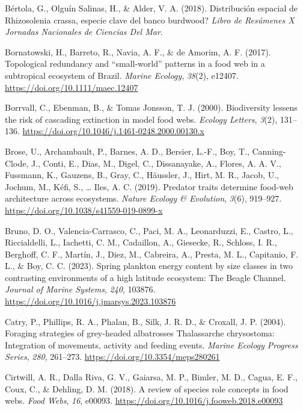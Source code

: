 \documentclass[preprint, 3p,
authoryear]{elsarticle} %
\newlength{\cslhangindent}
\newlength{\cslentryspacingunit} %
\newenvironment{CSLReferences}[2] %
 {%
  \setlength{\parindent}{0pt}
  \ifodd #1
  \let\oldpar\par
  \def\par{\hangindent=\cslhangindent\oldpar}
  \fi
  \setlength{\parskip}{#2\cslentryspacingunit}
 }%
 {}
\begin{document}
\begin{CSLReferences}{1}{0}
\leavevmode{}%
Bértola, G., Olguín Salinas, H., \& Alder, V. A. (2018). Distribución
espacial de {Rhizosolenia} crassa, \textquestiondown especie clave del
banco burdwood? \emph{Libro de Resúmenes {X Jornadas Nacionales} de
{Ciencias} Del {Mar}}.

\leavevmode{}%
Bornatowski, H., Barreto, R., Navia, A. F., \& de Amorim, A. F. (2017).
Topological redundancy and {``small-world''} patterns in a food web in a
subtropical ecosystem of {Brazil}. \emph{Marine Ecology}, \emph{38}(2),
e12407. \url{https://doi.org/10.1111/maec.12407}

\leavevmode{}%
Borrvall, C., Ebenman, B., \& Tomas Jonsson, T. J. (2000). Biodiversity
lessens the risk of cascading extinction in model food webs.
\emph{Ecology Letters}, \emph{3}(2), 131--136.
\url{https://doi.org/10.1046/j.1461-0248.2000.00130.x}

\leavevmode{}%
Brose, U., Archambault, P., Barnes, A. D., Bersier, L.-F., Boy, T.,
Canning-Clode, J., Conti, E., Dias, M., Digel, C., Dissanayake, A.,
Flores, A. A. V., Fussmann, K., Gauzens, B., Gray, C., Häussler, J.,
Hirt, M. R., Jacob, U., Jochum, M., Kéfi, S., \ldots{} Iles, A. C.
(2019). Predator traits determine food-web architecture across
ecosystems. \emph{Nature Ecology \& Evolution}, \emph{3}(6), 919--927.
\url{https://doi.org/10.1038/s41559-019-0899-x}

\leavevmode{}%
Bruno, D. O., Valencia-Carrasco, C., Paci, M. A., Leonarduzzi, E.,
Castro, L., Riccialdelli, L., Iachetti, C. M., Cadaillon, A., Giesecke,
R., Schloss, I. R., Berghoff, C. F., Martín, J., Diez, M., Cabreira, A.,
Presta, M. L., Capitanio, F. L., \& Boy, C. C. (2023). Spring plankton
energy content by size classes in two contrasting environments of a high
latitude ecosystem: {The Beagle Channel}. \emph{Journal of Marine
Systems}, \emph{240}, 103876.
\url{https://doi.org/10.1016/j.jmarsys.2023.103876}

\leavevmode{}%
Catry, P., Phillips, R. A., Phalan, B., Silk, J. R. D., \& Croxall, J.
P. (2004). Foraging strategies of grey-headed albatrosses {Thalassarche}
chrysostoma: Integration of movements, activity and feeding events.
\emph{Marine Ecology Progress Series}, \emph{280}, 261--273.
\url{https://doi.org/10.3354/meps280261}

\leavevmode{}%
Cirtwill, A. R., Dalla Riva, G. V., Gaiarsa, M. P., Bimler, M. D.,
Cagua, E. F., Coux, C., \& Dehling, D. M. (2018). A review of species
role concepts in food webs. \emph{Food Webs}, \emph{16}, e00093.
\url{https://doi.org/10.1016/j.fooweb.2018.e00093}


\end{CSLReferences}
\end{document}
